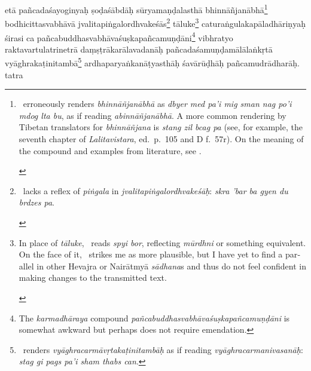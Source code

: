 \documentclass[naipra.tex]{subfiles}
\begin{document}
\begin{sanskrit}

\pstart
etā pañcadaśayoginyaḥ ṣoḍaśābdāḥ sūryamaṇḍalasthā bhinnāñjanābhā\footnote{
	\begin{english}%
		\TIB\ erroneously renders \emph{bhinnāñjanābhā} as \emph{dbyer med pa'i mig sman nag po'i mdog lta bu}, as if reading \emph{abinnāñjanābhā}.
		A more common rendering by Tibetan translators for \emph{bhinnāñjana} is \emph{stang zil bcag pa} (see, for example, the seventh chapter of \emph{Lalitavistara}, ed.\ p.\ 105 and D f.\ 57r).
		On the meaning of the compound and examples from literature, see \cite{vogel1968}.
	\end{english}
} bodhicittasvabhāvā jvalitapiṅgalordhvakeśās\footnote{
	\begin{english}%
		\TIB\ lacks a reflex of \emph{piṅgala} in \emph{jvalitapiṅgalordhvakeśāḥ}: \emph{skra 'bar ba gyen du brdzes pa}.
	\end{english}
} \crux tāluke\crux\footnote{
	\begin{english}%
		In place of \emph{tāluke}, \TIB\ reads \emph{spyi bor}, reflecting \emph{mūrdhni} or something equivalent.
		On the face of it, \TIB\ strikes me as more plausible, but I have yet to find a parallel in other Hevajra or Nairātmyā \emph{sādhana}s and thus do not feel confident in making changes to the transmitted text. 
	\end{english}
} caturaṅgulakapāladhāriṇyaḥ śirasi ca pañcabuddhasvabhāvaśuṣkapañcamuṇḍāni\footnote{
	The \emph{karmadhāraya} compound \emph{pañcabuddhasvabhāvaśuṣkapañcamuṇḍāni} is somewhat awkward but perhaps does not require emendation.
} vibhratyo raktavartulatrinetrā daṃṣṭrākarālavadanāḥ pañcadaśamuṇḍamālālaṅkṛtā vyāghrakaṭinitambā\footnote{
	\TIB\ renders \emph{vyāghracarmāvṛtakaṭinitambāḥ} as if reading \emph{vyāghracarmanivasanāḥ}: \emph{stag gi pags pa'i sham thabs can}.
} ardhaparyaṅkanāṭyasthāḥ śavārūḍhāḥ pañcamudrādharāḥ. tatra\Emdash
\pend



\end{sanskrit}
\end{document}
